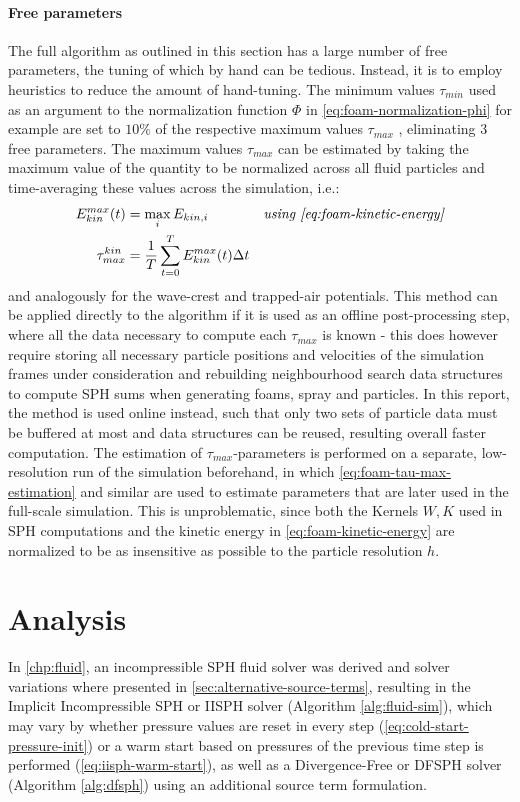 \documentclass[oneside, a4paper]{book}
\begin{document}
  \subsubsection{Free parameters}
  The full algorithm as outlined in this section has a large number of free parameters, the tuning of which by hand can be tedious. Instead, it is \autocite[suggested]{turbulent-micropolar-foam} to employ heuristics to reduce the amount of hand-tuning. The minimum values $\tau_{min}$ used as an argument to the normalization function $\Phi$ in \autoref{eq:foam-normalization-phi} for example are set to $10\%$ of the respective maximum values $\tau_{max}$ \autocite{turbulent-micropolar-foam}, eliminating 3 free parameters. The maximum values $\tau_{max}$ can be estimated by taking the maximum value of the quantity to be normalized across all fluid particles and time-averaging these values across the simulation, i.e.:
  \begin{align}\label{eq:foam-tau-max-estimation}
    E_{kin}^{max}(t) &= \max_i E_{kin,i} &\textit{using \autoref{eq:foam-kinetic-energy}}\\
    \tau_{max}^{kin} &= \frac{1}{T} \sum_{t=0}^T  E_{kin}^{max}(t) \Delta t
  \end{align}
  and analogously for the wave-crest and trapped-air potentials. This method can be applied directly to the algorithm if it is used as an offline post-processing step, where all the data necessary to compute each $\tau_{max}$ is known - this does however require storing all necessary particle positions and velocities of the simulation frames under consideration and rebuilding neighbourhood search data structures to compute SPH sums when generating foams, spray and particles. In this report, the method is used online instead, such that only two sets of particle data must be buffered at most and data structures can be reused, resulting overall faster computation. The estimation of $\tau_{max}$-parameters is performed on a separate, low-resolution run of the simulation beforehand, in which \autoref{eq:foam-tau-max-estimation} and similar are used to estimate parameters that are later used in the full-scale simulation. This is unproblematic, since both the Kernels $W,K$ used in SPH computations and the kinetic energy in \autoref{eq:foam-kinetic-energy} are normalized to be as insensitive as possible to the particle resolution $h$.

\chapter{Analysis}\label{chp:analysis}
  In \autoref{chp:fluid}, an incompressible SPH fluid solver was derived and solver variations where presented in \autoref{sec:alternative-source-terms}, resulting in the Implicit Incompressible SPH or IISPH solver (Algorithm \ref{alg:fluid-sim}), which may vary by whether pressure values are reset in every step (\autoref{eq:cold-start-pressure-init}) or a warm start based on pressures of the previous time step is performed (\autoref{eq:iisph-warm-start}), as well as a Divergence-Free or DFSPH solver (Algorithm \ref{alg:dfsph}) using an additional source term formulation. 
  
\end{document}
